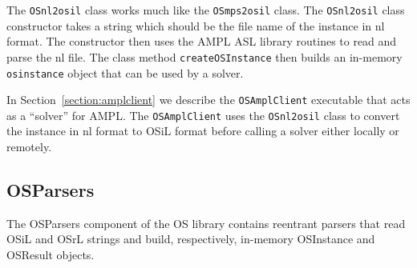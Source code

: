 \documentclass[11pt]{article}
\renewcommand{\_}{{\char"5F}}
\renewcommand{\{}{{\char"7B}}
\renewcommand{\}}{{\char"7D}}
\renewcommand{\^}{{\char"0D}}
\renewcommand{\'}{{\char"0D}}
\begin{document}
\begin{enumerate}[Step 1:]
The {\tt OSnl2osil} class works much like the {\tt OSmps2osil} class. The
{\tt OSnl2osil} class constructor takes a string which should be the file name of the instance in nl format. The constructor then uses the AMPL ASL library routines to read and parse the nl file. The class method {\tt createOSInstance} then builds  an in-memory {\tt osinstance} object  that can be used by a solver.

In Section~\ref{section:amplclient}  we describe the {\tt OSAmplClient}
executable that acts as a ``solver'' for AMPL. The {\tt OSAmplClient} uses the {\tt OSnl2osil} class to convert
the instance in nl format to OSiL format before calling a solver either locally or remotely.


\subsection{OSParsers}\label{section:osparsers}

The OSParsers component of the OS library contains reentrant parsers that  read OSiL and OSrL
strings and build, respectively, in-memory OSInstance and 
OSResult  objects.



\end{enumerate}
\end{document}
